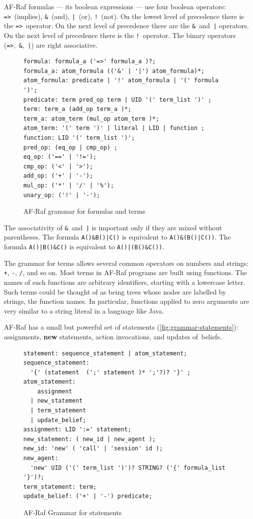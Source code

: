\documentclass[a4paper,12pt,oneside,fleqn]{book} %
\begin{document}
{AF-Raf formulas --- its boolean expressions --- use four boolean operators:
\verb+=>+~(implies), \verb+&+~(and), \verb+|+~(or), \verb+!+~(not).  On the
lowest level of precedence there is the \verb+=>+~operator.  On the next
level of precedence there are the \verb+&+~and~\verb+|+ operators. On the
next level of precedence there is the \verb+!+~operator.  The binary
operators (\verb+=>+,~\verb+&+,~\verb+|+) are right associative.

\begin{figure}\footnotesize %
\begin{verbatim}
formula: formula_a ('=>' formula_a )?;
formula_a: atom_formula (('&' | '|') atom_formula)*;
atom_formula: predicate | '!' atom_formula | '(' formula ')';
predicate: term pred_op term | UID '(' term_list ')' ;
term: term_a (add_op term_a )*;
term_a: atom_term (mul_op atom_term )*;
atom_term: '(' term ')' | literal | LID | function ;
function: LID '(' term_list ')';
pred_op: (eq_op | cmp_op) ;
eq_op: ('==' | '!=');
cmp_op: ('<' | '>');
add_op: ('+' | '-');
mul_op: ('*' | '/' | '%');
unary_op: ('!' | '-');
\end{verbatim}
\caption{AF-Raf grammar for formulas and terms}
\label{fig:grammar-expr}
\end{figure} %

\begin{example}
The associativity of \verb+&+~and~\verb+|+ is important only if they are
mixed without parentheses.  The formula \verb+A()&B()|C()+ is equivalent to
\verb+A()&(B()|C())+.  The formula \verb+A()|B()&C()+ is equivalent to
\verb+A()|(B()&C())+.
\end{example}

The grammar for terms allows several common operators on numbers and
strings: \verb-+-, \verb+-+, \verb+/+, and so on. Most terms in AF-Raf
programs are built using functions. The names of such functions are
arbitrary identifiers, starting with a lowercase letter. Such terms could
be thought of as being trees whose nodes are labelled by strings, the
function names. In particular, functions applied to zero arguments are very
similar to a string literal in a language like Java.

AF-Raf has a small but powerful set of statements
(\autoref{fig:grammar-statements}): assignments, {\bf new} statements,
action invocations, and updates of~beliefs.

\begin{figure}\footnotesize %
\begin{verbatim}
statement: sequence_statement | atom_statement;
sequence_statement:
  '{' (statement  (';' statement )* ';'?)? '}' ;
atom_statement:
    assignment
  | new_statement
  | term_statement
  | update_belief;
assignment: LID ':=' statement;
new_statement: ( new_id | new_agent );
new_id: 'new' ( 'call' | 'session' id );
new_agent:
  'new' UID ('(' term_list ')')? STRING? ('{' formula_list '}')?;
term_statement: term;
update_belief: ('+' | '-') predicate;
\end{verbatim}
\caption{AF-Raf Grammar for statements}
\label{fig:grammar-statements}
\end{figure} %

}
\end{document}

